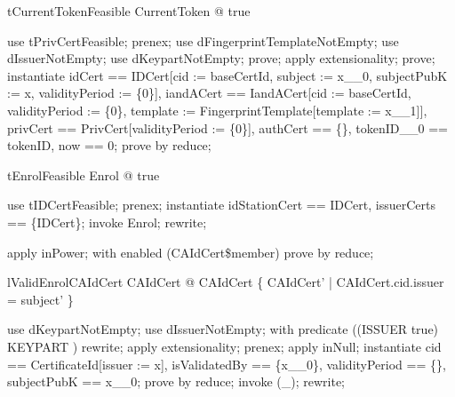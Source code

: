 \begin{theorem}{tCurrentTokenFeasible}
\exists  CurrentToken @ true
\end{theorem}

\begin{zproof}[tCurrentTokenFeasible]
use tPrivCertFeasible;
prenex;
use dFingerprintTemplateNotEmpty;
use dIssuerNotEmpty;
use dKeypartNotEmpty;
prove;
apply extensionality;
prove;
instantiate idCert == \theta  IDCert[cid := baseCertId, subject := x\_\_0, subjectPubK := x, validityPeriod := \{0\}], iandACert == \theta  IandACert[cid := baseCertId, validityPeriod := \{0\}, template := \theta  FingerprintTemplate[template := x\_\_1]], privCert == \theta  PrivCert[validityPeriod := \{0\}], authCert == \{\}, tokenID\_\_0 == tokenID, now == 0;
prove by reduce;
\end{zproof}

\begin{theorem}{tEnrolFeasible}
\exists  Enrol @ true
\end{theorem}

\begin{zproof}[tEnrolFeasible]
use tIDCertFeasible;
prenex;
instantiate idStationCert == \theta  IDCert, issuerCerts == \{\theta  IDCert\};
invoke Enrol;
rewrite;
\end{zproof}


\begin{zproof}[gCAIdCert]
apply inPower;
with enabled (CAIdCert\$member) prove by reduce;
\end{zproof}

\begin{theorem}{lValidEnrolCAIdCert}
\exists  CAIdCert @ \theta  CAIdCert \in  \{  CAIdCert' | \theta  CAIdCert.cid.issuer = subject' \}
\end{theorem}

\begin{zproof}[lValidEnrolCAIdCert]
use dKeypartNotEmpty;
use dIssuerNotEmpty;
with predicate ((ISSUER \neq  \emptyset \iff  true) \land  KEYPART \neq  \emptyset) rewrite;
apply extensionality;
prenex;
apply inNull;
instantiate cid == \theta  CertificateId[issuer := x], isValidatedBy == \{x\_\_0\}, validityPeriod == \{\}, subjectPubK == x\_\_0;
prove by reduce;
invoke (\Optional \_);
rewrite;
\end{zproof}

